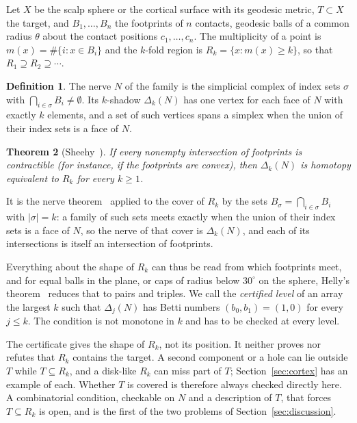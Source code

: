 \documentclass[11pt]{amsart}
\newtheorem{theorem}{Theorem}
\theoremstyle{definition}
\newtheorem{definition}[theorem]{Definition}
\theoremstyle{remark}
\begin{document}
Let $X$ be the scalp sphere or the cortical surface with its geodesic metric,
$T\subset X$ the target, and $B_1,\dots,B_n$ the footprints of $n$ contacts,
geodesic balls of a common radius $\theta$ about the contact positions
$c_1,\dots,c_n$. The multiplicity of a point is
$m(x)=\#\{i : x\in B_i\}$ and the $k$-fold region is
$R_k=\{x : m(x)\ge k\}$, so that $R_1\supseteq R_2\supseteq\cdots$.

\begin{definition}
The nerve $N$ of the family is the simplicial complex of index sets $\sigma$
with $\bigcap_{i\in\sigma}B_i\neq\emptyset$. Its $k$-shadow $\Delta_k(N)$ has one
vertex for each face of $N$ with exactly $k$ elements, and a set of such
vertices spans a simplex when the union of their index sets is a face of $N$.
\end{definition}

\begin{theorem}[Sheehy~\cite{Sheehy2012}]\label{thm:multicover}
If every nonempty intersection of footprints is contractible (for instance,
if the footprints are convex), then $\Delta_k(N)$ is homotopy equivalent to
$R_k$ for every $k\ge1$.
\end{theorem}

It is the nerve theorem~\cite{Borsuk1948} applied to the cover of $R_k$ by
the sets $B_\sigma=\bigcap_{i\in\sigma}B_i$ with $|\sigma|=k$: a family of
such sets meets exactly when the union of their index sets is a face of $N$,
so the nerve of that cover is $\Delta_k(N)$, and each of its intersections is
itself an intersection of footprints.

Everything about the shape of $R_k$ can thus be read from which footprints
meet, and for equal balls in the plane, or caps of radius below
$30^\circ$ on the sphere, Helly's theorem~\cite{Helly1923} reduces that to
pairs and triples. We call the \emph{certified level} of an array the largest
$k$ such that $\Delta_j(N)$ has Betti numbers $(b_0,b_1)=(1,0)$ for every
$j\le k$. The condition is not monotone in $k$ and has to be checked at every
level.

The certificate gives the shape of $R_k$, not its position. It neither
proves nor refutes that $R_k$ contains the target. A second component or a
hole can lie outside $T$ while $T\subseteq R_k$, and a disk-like $R_k$ can miss
part of $T$; Section~\ref{sec:cortex} has an example of each. Whether $T$ is
covered is therefore always checked directly here. A combinatorial condition,
checkable on $N$ and a description of $T$, that forces $T\subseteq R_k$ is
open, and is the first of the two problems of Section~\ref{sec:discussion}.
\end{document}

